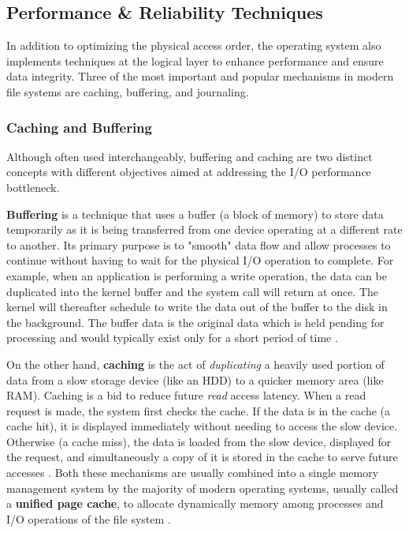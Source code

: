 \documentclass[12pt]{article}
\begin{document}



\subsection{Performance \& Reliability Techniques}
In addition to optimizing the physical access order, the operating system also implements techniques at the logical layer to enhance performance and ensure data integrity. Three of the most important and popular mechanisms in modern file systems are caching, buffering, and journaling.

\subsubsection{Caching and Buffering}
Although often used interchangeably, buffering and caching are two distinct concepts with different objectives aimed at addressing the I/O performance bottleneck.

\textbf{Buffering} is a technique that uses a buffer (a block of memory) to store data temporarily as it is being transferred from one device operating at a different rate to another. Its primary purpose is to "smooth" data flow and allow processes to continue without having to wait for the physical I/O operation to complete. For example, when an application is performing a write operation, the data can be duplicated into the kernel buffer and the system call will return at once. The kernel will thereafter schedule to write the data out of the buffer to the disk in the background. The buffer data is the original data which is held pending for processing and would typically exist only for a short period of time \parencite{GeeksForGeeks2025BufferCache}.

On the other hand, \textbf{caching} is the act of \textit{duplicating} a heavily used portion of data from a slow storage device (like an HDD) to a quicker memory area (like RAM). Caching is a bid to reduce future \textit{read} access latency. When a read request is made, the system first checks the cache. If the data is in the cache (a cache hit), it is displayed immediately without needing to access the slow device. Otherwise (a cache miss), the data is loaded from the slow device, displayed for the request, and simultaneously a copy of it is stored in the cache to serve future accesses \parencite{GeeksForGeeks2025BufferCache}. Both these mechanisms are usually combined into a single memory management system by the majority of modern operating systems, usually called a \textbf{unified page cache}, to allocate dynamically memory among processes and I/O operations of the file system \parencite{Silberschatz2018}.
\end{document}

